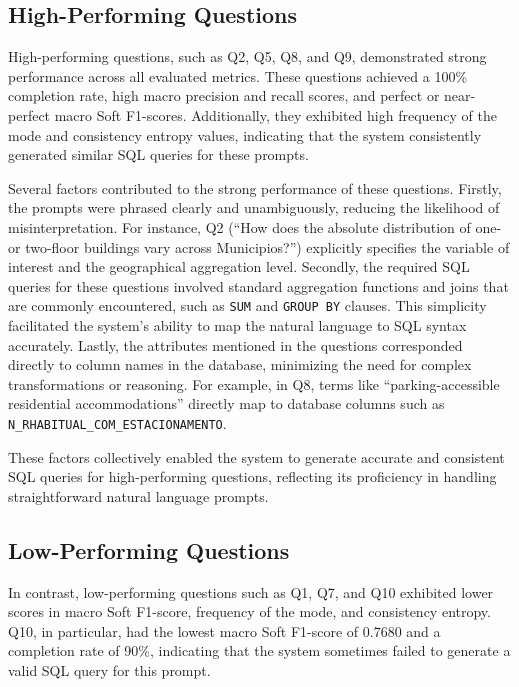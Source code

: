 \subsection{High-Performing Questions}

High-performing questions, such as Q2, Q5, Q8, and Q9, demonstrated strong performance across all evaluated metrics. These questions achieved a 100\% completion rate, high macro precision and recall scores, and perfect or near-perfect macro Soft F1-scores. Additionally, they exhibited high frequency of the mode and consistency entropy values, indicating that the system consistently generated similar SQL queries for these prompts.

Several factors contributed to the strong performance of these questions. Firstly, the prompts were phrased clearly and unambiguously, reducing the likelihood of misinterpretation. For instance, Q2 (“How does the absolute distribution of one- or two-floor buildings vary across Municipios?”) explicitly specifies the variable of interest and the geographical aggregation level. Secondly, the required SQL queries for these questions involved standard aggregation functions and joins that are commonly encountered, such as \texttt{SUM} and \texttt{GROUP BY} clauses. This simplicity facilitated the system's ability to map the natural language to SQL syntax accurately. Lastly, the attributes mentioned in the questions corresponded directly to column names in the database, minimizing the need for complex transformations or reasoning. For example, in Q8, terms like “parking-accessible residential accommodations” directly map to database columns such as \lstinline!N_RHABITUAL_COM_ESTACIONAMENTO!.

These factors collectively enabled the system to generate accurate and consistent SQL queries for high-performing questions, reflecting its proficiency in handling straightforward natural language prompts.

\subsection{Low-Performing Questions}

In contrast, low-performing questions such as Q1, Q7, and Q10 exhibited lower scores in macro Soft F1-score, frequency of the mode, and consistency entropy. Q10, in particular, had the lowest macro Soft F1-score of 0.7680 and a completion rate of 90\%, indicating that the system sometimes failed to generate a valid SQL query for this prompt.

